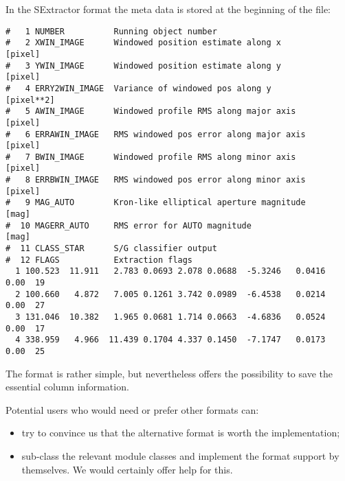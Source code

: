 In the SExtractor format the meta data is stored at the beginning of the
file:
\begin{small}
\begin{verbatim}
#   1 NUMBER          Running object number
#   2 XWIN_IMAGE      Windowed position estimate along x              [pixel]
#   3 YWIN_IMAGE      Windowed position estimate along y              [pixel]
#   4 ERRY2WIN_IMAGE  Variance of windowed pos along y                [pixel**2]
#   5 AWIN_IMAGE      Windowed profile RMS along major axis           [pixel]
#   6 ERRAWIN_IMAGE   RMS windowed pos error along major axis         [pixel]
#   7 BWIN_IMAGE      Windowed profile RMS along minor axis           [pixel]
#   8 ERRBWIN_IMAGE   RMS windowed pos error along minor axis         [pixel]
#   9 MAG_AUTO        Kron-like elliptical aperture magnitude         [mag]
#  10 MAGERR_AUTO     RMS error for AUTO magnitude                    [mag]
#  11 CLASS_STAR      S/G classifier output
#  12 FLAGS           Extraction flags
  1 100.523  11.911   2.783 0.0693 2.078 0.0688  -5.3246   0.0416  0.00  19
  2 100.660   4.872   7.005 0.1261 3.742 0.0989  -6.4538   0.0214  0.00  27
  3 131.046  10.382   1.965 0.0681 1.714 0.0663  -4.6836   0.0524  0.00  17
  4 338.959   4.966  11.439 0.1704 4.337 0.1450  -7.1747   0.0173  0.00  25
\end{verbatim}
\end{small}

The format is rather simple, but nevertheless offers the possibility to save the
essential column information.

Potential users who would need or prefer other formats can:
\begin{itemize}
\item try to convince us that the alternative format is worth the implementation;
\item sub-class the relevant module classes and implement the format support by
themselves. We would certainly offer help for this.
\end{itemize}

